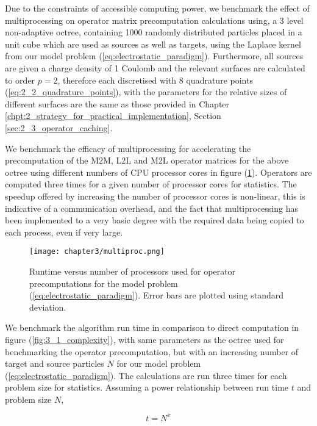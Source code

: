 Due to the constraints of accessible computing power, we benchmark the effect of
multiprocessing on operator matrix precomputation calculations using, a 3 level
non-adaptive octree, containing 1000 randomly distributed
particles placed in a unit cube which are used as sources as well as targets,
using the Laplace kernel from our model problem (\ref{eq:electrostatic_paradigm}).
Furthermore, all sources are given a charge density of 1 Coulomb and the relevant surfaces
are calculated to order $p=2$, therefore each discretised with $8$ quadrature points
(\ref{eq:2_2_quadrature_points}), with the parameters for the relative sizes
of different surfaces are the same as those provided
in Chapter \ref{chpt:2_strategy_for_practical_implementation},
Section \ref{sec:2_3_operator_caching}.

We benchmark the efficacy of multiprocessing for accelerating the precomputation
of the \gls{M2M}, \gls{L2L} and \gls{M2L} operator matrices for the above octree
using different numbers of \gls{CPU} processor cores in figure (\ref{fig:3_1_multiproc}).
Operators are computed three times for a given number of processor cores
for statistics. The speedup offered by increasing the number of processor cores
is non-linear, this is indicative of a communication overhead, and the
fact that multiprocessing has been implemented to a very basic degree with
the required data being copied to each process, even if very large.

\begin{figure}[ht]
    \centering

  {\texttt{[image: chapter3/multiproc.png]}}
  \vspace{0pt}
    \caption{Runtime versus number of processors used for operator precomputations
    for the model problem (\ref{eq:electrostatic_paradigm}). Error bars are
    plotted using standard deviation.
    }
    \label{fig:3_1_multiproc}
\end{figure}

We benchmark the algorithm run time in comparison to direct computation in figure
(\ref{fig:3_1_complexity}), with same parameters as the octree used for benchmarking
the operator precomputation, but with an increasing number of target and source
particles $N$ for our model problem (\ref{eq:electrostatic_paradigm}). The
calculations are run three times for each problem size for statistics.
Assuming a power relationship between run time $t$ and problem size $N$,

\begin{equation}
    t = N^x
\end{equation}

